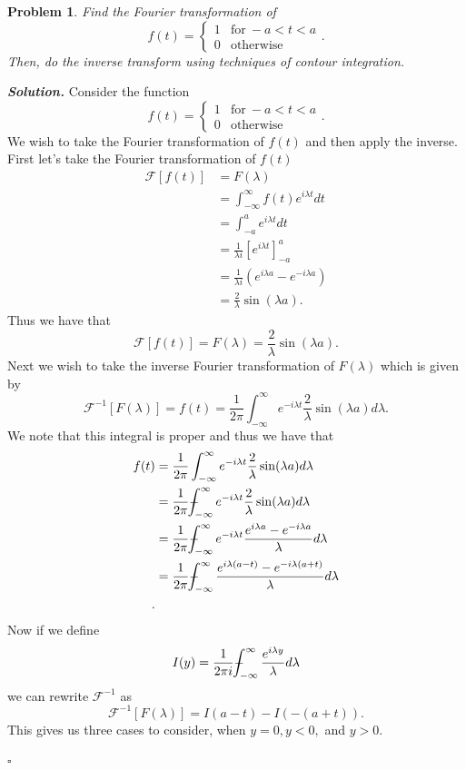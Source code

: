 \documentclass[12pt]{report}
\newtheorem{problem}{Problem}
\newenvironment{solution}[1][\it{Solution}]{\textbf{#1. } }{$\square$}
\def\F{{\mathcal{F}}}
\newcommand{\paren}[1]{{\left(#1\right)}} %
\def\Xint#1{\mathchoice
   {\XXint\displaystyle\textstyle{#1}}%
   {\XXint\textstyle\scriptstyle{#1}}%
   {\XXint\scriptstyle\scriptscriptstyle{#1}}%
   {\XXint\scriptscriptstyle\scriptscriptstyle{#1}}%
   \!\int}
\def\XXint#1#2#3{{\setbox0=\hbox{$#1{#2#3}{\int}$}
     \vcenter{\hbox{$#2#3$}}\kern-.5\wd0}}
\def\dashint{\Xint-}
\begin{document}

\begin{problem}
    Find the Fourier transformation of
    \[ 
    f(t) = 
    \begin{cases}
        1 & \text{for} ~ -a < t < a\\
        0 & \text{otherwise}
    \end{cases}.
    \]
    Then, do the inverse transform using techniques of contour integration.
\end{problem}

\begin{solution}
    \noindent
    Consider the function
    \[ 
        f(t) = 
        \begin{cases}
            1 & \text{for} ~ -a < t < a\\
            0 & \text{otherwise}
        \end{cases}.
    \]
    We wish to take the Fourier transformation of $f(t)$ and then apply the inverse. First let's take the Fourier transformation of $f(t)$
    \begin{align*}
        \F[f(t)] &= F(\lambda)\\
        &= \int_{-\infty}^{\infty}f(t)e^{i\lambda t}dt\\
        &= \int_{-a}^{a} e^{i\lambda t}dt\\
        &= \frac{1}{\lambda i}\left[ e^{i\lambda t}\right]^a_{-a}\\
        &= \frac{1}{\lambda i}\paren{e^{i\lambda a} - e^{-i \lambda a}}\\
        &= \frac{2}{\lambda}\sin(\lambda a). 
    \end{align*}
    Thus we have that
    \[ \F[f(t)] = F(\lambda) = \frac{2}{\lambda}\sin(\lambda a).\]
    Next we wish to take the inverse Fourier transformation of $F(\lambda)$ which is given by
    \[\F^{-1}[F(\lambda)] = f(t) = \frac{1}{2\pi}\int_{-\infty}^{\infty}e^{-i\lambda t} \frac{2}{\lambda}\sin(\lambda a)d\lambda.\]
    We note that this integral is proper and thus we have that
    \begin{align*}
        f(t) &= \frac{1}{2\pi}\int_{-\infty}^{\infty}e^{-i\lambda t} \frac{2}{\lambda}\sin(\lambda a)d\lambda\\
        &=\frac{1}{2\pi}\dashint_{-\infty}^{\infty}e^{-i\lambda t} \frac{2}{\lambda}\sin(\lambda a)d\lambda\\
        &=\frac{1}{2\pi}\dashint_{-\infty}^{\infty}e^{-i\lambda t} \frac{e^{i\lambda a} - e^{-i \lambda a}}{\lambda} d\lambda\\
        &=\frac{1}{2\pi}\dashint_{-\infty}^{\infty} \frac{e^{i\lambda (a - t)} - e^{-i \lambda (a + t)}}{\lambda} d\lambda\\.
    \end{align*}
    Now if we define 
    \[ I(y) = \frac{1}{2\pi i} \dashint_{-\infty}^{\infty} \frac{e^{i\lambda y}}{\lambda} d\lambda\]
    we can rewrite $\F^{-1}$ as
    \[ \F^{-1}[F(\lambda)] = I(a -t) - I(-(a+t)).\]
    This gives us three cases to consider, when $y=0, y < 0,$ and $y > 0$.


\end{solution}
\end{document}
